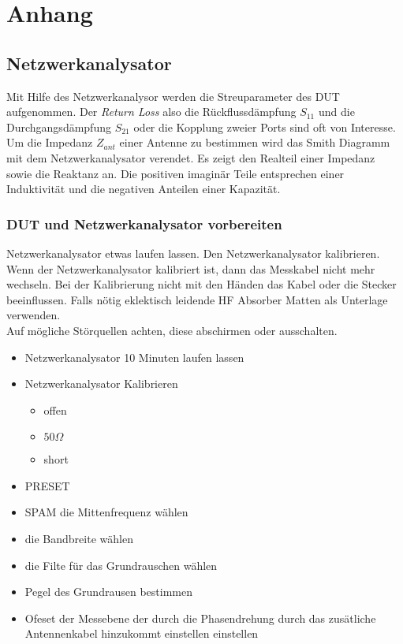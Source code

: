 \chapter{Anhang}
\section{ Netzwerkanalysator }
Mit Hilfe des Netzwerkanalysor werden die Streuparameter des DUT aufgenommen. Der \textit{Return Loss} also  die Rückflussdämpfung $S_{11}$ und die Durchgangsdämpfung $S_{21}$ oder die Kopplung zweier Ports sind oft von Interesse.\\
	Um die Impedanz $Z_{ant}$ einer Antenne zu bestimmen wird das Smith Diagramm mit dem Netzwerkanalysator verendet. Es zeigt den Realteil einer Impedanz sowie die Reaktanz an. Die positiven imaginär Teile entsprechen einer Induktivität  und die negativen Anteilen einer Kapazität.
	
	\subsection{DUT und Netzwerkanalysator vorbereiten}
	Netzwerkanalysator etwas laufen lassen. Den Netzwerkanalysator kalibrieren.  Wenn der Netzwerkanalysator kalibriert ist, dann das Messkabel nicht mehr wechseln. Bei der Kalibrierung nicht mit den Händen das Kabel oder die Stecker beeinflussen. Falls nötig eklektisch leidende HF Absorber Matten als Unterlage verwenden. \\
	Auf mögliche Störquellen achten, diese abschirmen oder ausschalten.
	\begin{itemize}
	\item Netzwerkanalysator 10 Minuten laufen lassen
	\item Netzwerkanalysator Kalibrieren
	\begin{itemize}
	\item offen
	\item $50\Omega$
	\item short
	\end{itemize}

	\item PRESET
	\item SPAM die Mittenfrequenz wählen
	\item die Bandbreite wählen
	\item die Filte für das Grundrauschen wählen
	\item Pegel des Grundrausen bestimmen
		\item Ofeset der Messebene  der durch die Phasendrehung durch das zusätliche Antennenkabel hinzukommt einstellen einstellen
	\end{itemize}
	
